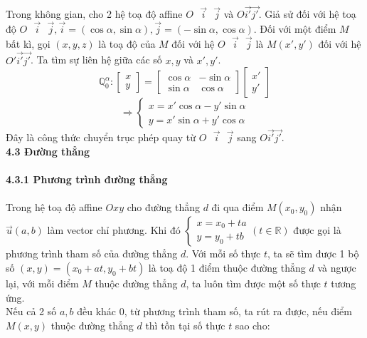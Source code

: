 \documentclass[12pt,a4]{article}
\begin{document}
\begin{titlepage}
\begin{center}
\begin{tikzpicture}[scale=2]
            \end{tikzpicture}
    \end{center} 
    Trong không gian, cho 2 hệ toạ độ affine $O\textbf{ }\vec{i}\textbf{ }\vec{j}$ và $O\vec{i'}\vec{j'}.$ Giả sử đối với hệ toạ độ $O\textbf{ }\vec{i}\textbf{ }\vec{j}, \vec{i} = (\cos\alpha,\sin\alpha), \vec{j} = (-\sin\alpha,\cos\alpha).$ Đối với một điểm $M$ bất kì, gọi $(x,y,z)$ là toạ độ của $M$ đối với hệ $O\textbf{ }\vec{i}\textbf{ }\vec{j}$ là $M(x',y')$ đối với hệ $O'\vec{i'}\vec{j'}$. Ta tìm sự liên hệ giữa các số $x,y$ và $x',y'$.
    \[
    \mathbb{Q}_0^\alpha: \begin{bmatrix} x\\y\end{bmatrix} = \begin{bmatrix} \cos\alpha & -\sin\alpha\\\sin\alpha & \cos\alpha\end{bmatrix} \begin{bmatrix} x'\\y'\end{bmatrix}
    \]
    \[
    \Rightarrow \begin{cases} x = x' \cos\alpha - y' \sin\alpha \\y = x'\sin\alpha + y'\cos\alpha\end{cases}
    \]
    Đây là công thức chuyển trục phép quay từ $O\textbf{ }\vec{i}\textbf{ }\vec{j}$ sang $O\vec{i'}\vec{j'}$.\\
    \textbf{4.3 Đường thẳng}\\
    \vspace{0.2cm}\\
    \textbf{4.3.1 Phương trình đường thẳng}\\
    \vspace{0.2cm}\\
    Trong hệ toạ độ affine $Oxy$ cho đường thẳng $d$ đi qua điểm $M(x_0,y_0)$ nhận $\vec{u}(a,b)$ làm vector chỉ phương. Khi đó $\begin{cases} x = x_0 + ta \\y = y_0 + tb\end{cases} (t \in \mathbb{R})$ được gọi là phương trình tham số của đường thẳng $d$. Với mỗi số thực $t$, ta sẽ tìm được 1 bộ số $(x,y) = (x_0 + at, y_0 + bt)$ là toạ độ 1 điểm thuộc đường thẳng $d$ và ngược lại, với mỗi điểm $M$ thuộc đường thẳng $d$, ta luôn tìm được một số thực $t$ tương ứng.\\
    Nếu cả 2 số $a,b$ đều khác 0, từ phương trình tham số, ta rút ra được, nếu điểm $M(x,y)$ thuộc đường thẳng $d$ thì tồn tại số thực $t$ sao cho:

\end{titlepage}
\end{document}
